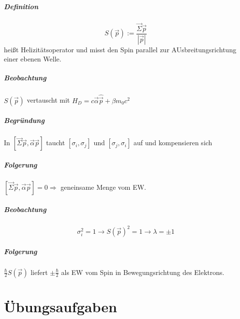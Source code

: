 \documentclass[twoside,a4paper]{scrartcl}
\renewcommand{\1}{\mathds{1}}
\newcommand{\Ra}{\Rightarrow}
\newcommand{\ra}{\rightarrow}
\begin{document}
\subsubsection*{Definition}
$$S(\vec p):=\frac{\vec \Sigma \vec p}{|\vec p|}$$
heißt Helizitätsoperator und misst den Spin parallel zur AUsbreitungsrichtung einer ebenen Welle.
\subsubsection*{Beobachtung}
$S(\vec  p)$ vertauscht mit $H_D=c \vec \alpha \hat{ \vec p}+\beta m_0c^2$
\subsubsection*{Begründung}
In $[\vec \Sigma \vec p,\vec \alpha \vec p]$ taucht $[\sigma_i,\sigma_j]$ und $[\sigma_j,\sigma_i]$ auf und kompensieren sich
\subsubsection*{Folgerung}
 $[\vec \Sigma \vec p,\vec \alpha \vec p]=0 \Ra$ geneinsame Menge vom EW.
\subsubsection*{Beobachtung}
$$\sigma_i^2=1 \ra S(\vec p)^2=1 \ra \lambda=\pm 1$$
\subsubsection*{Folgerung}
$\frac{\hbar}{2}S(\vec p)$ liefert $\pm \frac{\hbar}{2}$ als EW vom Spin in Bewegungsrichtung des Elektrons.


\part{Übungsaufgaben}
\end{document}
